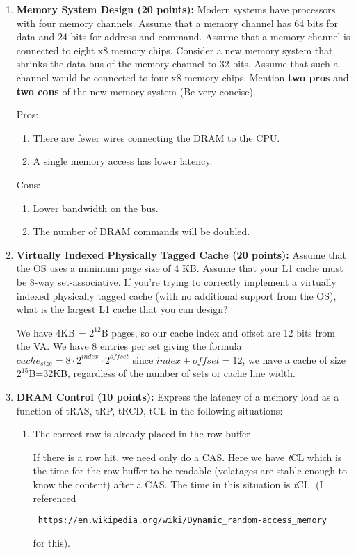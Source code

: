 \documentclass[a4paper, 11pt]{exam}
\begin{document}
\begin{enumerate}
\item \textbf{Memory System Design (20 points): } Modern systems have processors with four memory channels. Assume that a memory channel has 64 bits for data and 24 bits for address and command.
Assume that a memory channel is connected to eight x8 memory chips. Consider a new memory system that shrinks the data bus of the memory channel to 32 bits. Assume that such a channel would be connected to four x8 memory chips. Mention \textbf{two pros} and \textbf{two cons} of the new memory system (Be very concise).\newline

Pros:
\begin{enumerate}
\item There are fewer wires connecting the DRAM to the CPU.
\item A single memory access has lower latency.
\end{enumerate}

Cons:
\begin{enumerate}
\item Lower bandwidth on the bus.
\item The number of DRAM commands will be doubled.
\end{enumerate}
 
\item \textbf {Virtually Indexed Physically Tagged Cache (20 points): }  Assume that the OS uses a minimum page size of 4 KB. Assume that your L1 cache must be 8-way set-associative. If you're trying to correctly implement a virtually indexed physically tagged cache (with no additional support from the OS), what is the largest L1 cache that you can design? \newline

  We have 4KB = $2^{12}$B pages, so our cache index and offset are 12
  bits from the VA. We have 8 entries per set giving the formula
  $cache_{size}= 8\cdot2^{index}\cdot2^{offset}$ since
  $index + offset = 12$, we have a cache of size
  $2^{15}$B=32KB, regardless of the number of sets or cache line width.

\item \textbf {DRAM Control (10 points): } Express the latency of a memory load as a function of tRAS, tRP, tRCD, tCL in the following situations:

 \begin{enumerate}
 \item  The correct row is already placed in the row buffer

   If there is a row hit, we need only do a CAS. Here we have {\it
     t}CL which is the time for the row buffer to be readable
   (volatages are stable enough to know the content) after a CAS. The
   time in this situation is {\it t}CL. (I referenced 
   \begin{verbatim} https://en.wikipedia.org/wiki/Dynamic_random-access_memory\end{verbatim}
   for this).


\end{enumerate}
\end{enumerate}
\end{document}
